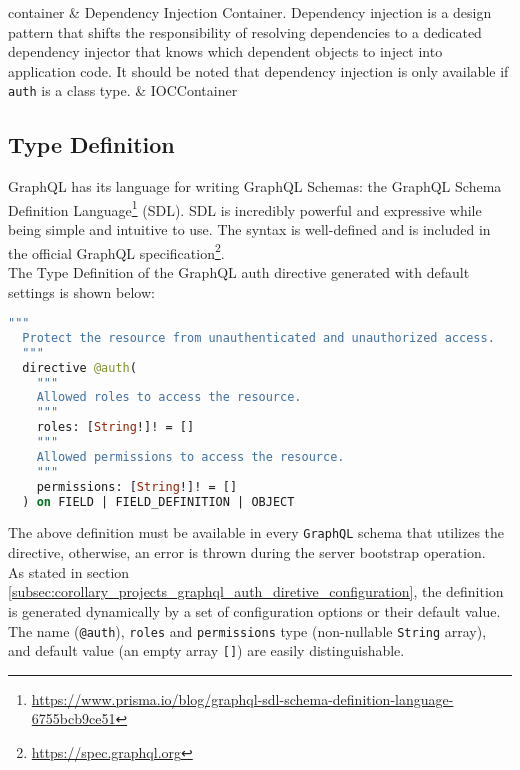 \begin{xltabular}
  container & Dependency Injection Container.
  \newline
  Dependency injection is a design pattern that shifts the responsibility of
  resolving dependencies to a dedicated dependency injector that knows which
  dependent objects to inject into application code\cite{dependency_injection}.
  \newline
  It should be noted that dependency injection is only available if \texttt{auth}
  is a class type. & IOCContainer \\

  \caption{GraphQL auth directive configuration parameters}
\end{xltabular}

\subsection{Type Definition}
\label{subsec:corollary_projects_graphql_auth_diretive_type_definition}

GraphQL has its language for writing GraphQL Schemas: the GraphQL Schema
Definition Language\footnote{\url{https://www.prisma.io/blog/graphql-sdl-schema-definition-language-6755bcb9ce51}}
(SDL). SDL is incredibly powerful and expressive while being simple and intuitive
to use. The syntax is well-defined and is included in the official GraphQL
specification\footnote{\url{https://spec.graphql.org}}. \\ %
The Type Definition of the GraphQL auth directive generated with default
settings is shown below:

\begin{lstlisting}[language=graphql, morekeywords={[2]{@auth}}, morekeywords={[4]{roles, permissions}}, xleftmargin=\parindent, caption=GraphQL auth directive Type Definition]
  """
  Protect the resource from unauthenticated and unauthorized access.
  """
  directive @auth(
    """
    Allowed roles to access the resource.
    """
    roles: [String!]! = []
    """
    Allowed permissions to access the resource.
    """
    permissions: [String!]! = []
  ) on FIELD | FIELD_DEFINITION | OBJECT
\end{lstlisting}

The above definition must be available in every \texttt{GraphQL} schema that
utilizes the directive, otherwise, an error is thrown during the server
bootstrap operation. \\ %
As stated in section
\ref{subsec:corollary_projects_graphql_auth_diretive_configuration}, the definition
is generated dynamically by a set of configuration options or their default value.
The name (\texttt{@auth}), \texttt{roles} and \texttt{permissions} type (non-nullable
\texttt{String} array), and default value (an empty array \texttt{[]}) are
easily distinguishable.

